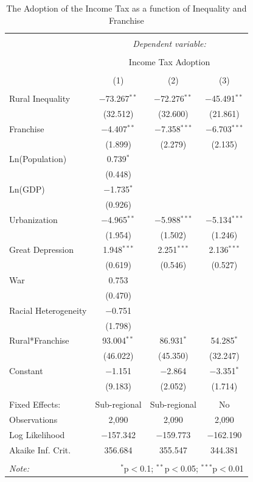 \documentclass[letter, 12pt]{article}
\begin{document}
\begin{table}[!htbp] \centering 
	\caption{The Adoption of the Income Tax as a function of Inequality and Franchise} 
	\label{} 
	\begin{tabular}{@{\extracolsep{5pt}}lccc} 
		\\[-1.8ex]\hline 
		\hline \\[-1.8ex] 
		& \multicolumn{3}{c}{\textit{Dependent variable:}} \\ 
		\cline{2-4} 
		\\[-1.8ex] & \multicolumn{3}{c}{Income Tax Adoption} \\ 
		\\[-1.8ex] & (1) & (2) & (3)\\ 
		\hline \\[-1.8ex] 
		Rural Inequality & $-$73.267$^{**}$ & $-$72.276$^{**}$ & $-$45.491$^{**}$ \\ 
		& (32.512) & (32.600) & (21.861) \\ 
		Franchise & $-$4.407$^{**}$ & $-$7.358$^{***}$ & $-$6.703$^{***}$ \\ 
		& (1.899) & (2.279) & (2.135) \\ 
		Ln(Population) & 0.739$^{*}$ &  &  \\ 
		& (0.448) &  &  \\ 
		Ln(GDP) & $-$1.735$^{*}$ &  &  \\ 
		& (0.926) &  &  \\ 
		Urbanization & $-$4.965$^{**}$ & $-$5.988$^{***}$ & $-$5.134$^{***}$ \\ 
		& (1.954) & (1.502) & (1.246) \\ 
		Great Depression & 1.948$^{***}$ & 2.251$^{***}$ & 2.136$^{***}$ \\ 
		& (0.619) & (0.546) & (0.527) \\ 
		War & 0.753 &  &  \\ 
		& (0.470) &  &  \\ 
		Racial Heterogeneity & $-$0.751 &  &  \\ 
		& (1.798) &  &  \\ 
		Rural*Franchise & 93.004$^{**}$ & 86.931$^{*}$ & 54.285$^{*}$ \\ 
		& (46.022) & (45.350) & (32.247) \\ 
		Constant & $-$1.151 & $-$2.864 & $-$3.351$^{*}$ \\ 
		& (9.183) & (2.052) & (1.714) \\ 
		\hline \\[-1.8ex] 
		Fixed Effects: & Sub-regional & Sub-regional & No \\ 
		Observations & 2,090 & 2,090 & 2,090 \\ 
		Log Likelihood & $-$157.342 & $-$159.773 & $-$162.190 \\ 
		Akaike Inf. Crit. & 356.684 & 355.547 & 344.381 \\ 
		\hline 
		\hline \\[-1.8ex] 
		\textit{Note:}  & \multicolumn{3}{r}{$^{*}$p$<$0.1; $^{**}$p$<$0.05; $^{***}$p$<$0.01} \\ 
	\end{tabular} 
\end{table}  
\end{document}

